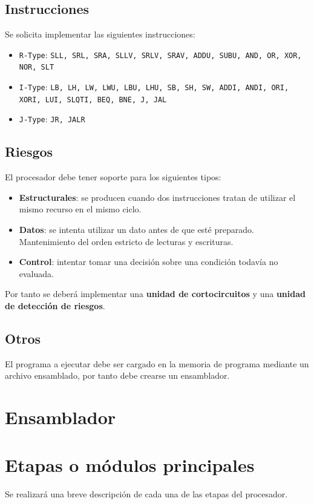 \documentclass[a4paper]{article}
\begin{document}
\subsection{Instrucciones} \label{section:instr}
Se solicita implementar las siguientes instrucciones:
\begin{itemize}
	\item \texttt{R-Type}: \texttt{SLL, SRL, SRA, SLLV, SRLV, SRAV, ADDU, SUBU, AND, OR, XOR, NOR, SLT}
	\item \texttt{I-Type}: \texttt{LB, LH, LW, LWU, LBU, LHU, SB, SH, SW, ADDI, ANDI, ORI, XORI, LUI, SLQTI, BEQ, BNE, J, JAL}
	\item \texttt{J-Type}: \texttt{JR, JALR}
\end{itemize}

\subsection{Riesgos}
El procesador debe tener soporte para los siguientes tipos:
\begin{itemize}
	\item \textbf{Estructurales}: se producen cuando dos instrucciones tratan de utilizar el mismo recurso en el mismo ciclo.
	\item \textbf{Datos}: se intenta utilizar un dato antes de que esté preparado. Mantenimiento del orden estricto de lecturas y escrituras.
	\item \textbf{Control}: intentar tomar una decisión sobre una condición todavía no evaluada.
\end{itemize}

Por tanto se deberá implementar una \textbf{unidad de cortocircuitos} y una \textbf{unidad de detección de riesgos}.

\subsection{Otros}
El programa a ejecutar debe ser cargado en la memoria de programa mediante un archivo ensamblado, por tanto debe crearse un ensamblador.

\section{Ensamblador}

\section{Etapas o módulos principales}
Se realizará una breve descripción de cada una de las etapas del procesador.
\end{document}
